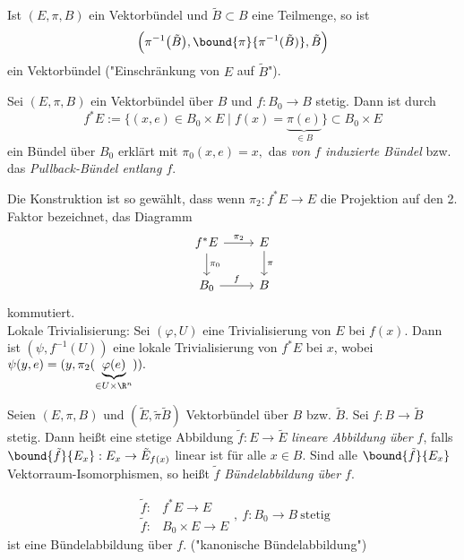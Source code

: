 \begin{defn}[Einschränkungen]
	Ist $ (E,\pi,B) $ ein Vektorbündel und $\tilde{B} \subset B$ eine Teilmenge, so ist
	\[ \Big( \pi^{-1} \big( \tilde{B} \big), \bound{\pi}{\pi^{-1} ( \tilde{B} )}, \tilde{B} \Big) \]
	ein Vektorbündel ("Einschränkung von $E$ auf $\tilde{B}$").
\end{defn}

\begin{defn}
	Sei $ (E ,\pi,B) $ ein Vektorbündel über $B$ und $f: B_0 \to B$ stetig. Dann ist durch
	\[ f^*E := \{(x,e) \in B_0 \times E \mid f(x) = \underbrace{\pi(e)}_{\in B}\} \subset B_0 \times E \]
	ein Bündel über $B_0$ erklärt mit $ \pi_0(x,e) = x, $ das \emph{von $f$ induzierte Bündel} bzw. das \emph{Pullback-Bündel entlang $f$}.
\end{defn}

\begin{rem}
	Die Konstruktion ist so gewählt, dass wenn $\pi_2: f^*E \to E$ die Projektion auf den 2. Faktor bezeichnet, das Diagramm
	\[ \begin{tikzcd}
		f^*E \arrow{r}{\pi_2} \arrow{d}{\pi_0} & E \arrow{d}{\pi}\\
		B_0 \arrow{r}{f} & B
	\end{tikzcd} \]
	kommutiert.\\
	Lokale Trivialisierung: Sei $ (\varphi,U) $ eine Trivialisierung von $E$ bei $f(x)$. Dann ist $ (\psi,f^{-1}(U)) $ eine lokale Trivialisierung von $f^*E$ bei $x$, wobei $ \psi(y,e) = (y,\pi_2(\underbrace{\varphi(e)}_{\in U \times \R^n})). $
\end{rem}

\begin{defn}
	Seien $ (E,\pi,B) $ und $ (\tilde{E},\tilde{\pi}\tilde{B}) $ Vektorbündel über $B$ bzw. $\tilde{B}$. Sei $f: B \to \tilde{B}$ stetig. Dann heißt eine stetige Abbildung $\tilde{f}: E \to \tilde{E}$ \emph{lineare Abbildung über $f$}, falls $ \bound{\tilde{f}}{E_x}: E_x \to \tilde{E}_{f(x)} $ linear ist für alle $x \in B$. Sind alle $ \bound{\tilde{f}}{E_x} $ Vektorraum-Isomorphismen, so heißt $\tilde{f}$ \emph{Bündelabbildung über $f$}.
\end{defn}
	
\begin{exmp*}
	\[ \begin{aligned}
		\tilde{f}:& f^*E \to E\\
		\tilde{f}:& B_0 \times E \to E
	\end{aligned},\ f:B_0 \to B \ \text{stetig} \]
	ist eine Bündelabbildung über $f$. ("kanonische Bündelabbildung")
\end{exmp*}

